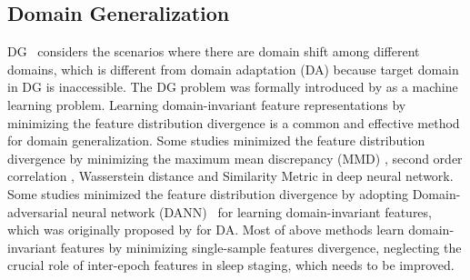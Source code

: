 \documentclass[letterpaper]{article} %
\begin{document}
	\subsection{Domain Generalization}
	DG~\citep{gulrajani2021in, zhou2021domain, wang2022generalizing} considers the scenarios where there are domain shift among different domains, which is different from domain adaptation (DA) \citep{wang2018deep, zhao2021plug} because target domain in DG is inaccessible.
	The DG problem was formally introduced by \citet{blanchard2011generalizing, muandet2013domain} as a machine learning problem.
	Learning domain-invariant feature representations by minimizing the feature distribution divergence is a common and effective method for domain generalization.
	Some studies minimized the feature distribution divergence by minimizing the maximum mean discrepancy (MMD) \citep{tzeng2014deep, wang2018visual, wang2020transfer}, second order correlation \citep{sun2016return, sun2016deep}, Wasserstein distance \citep{zhou2020domain} and Similarity Metric \citep{dou2019domain} in deep neural network.
	Some studies minimized the feature distribution divergence by adopting Domain-adversarial neural network (DANN)~\citep{li2018domain} for learning domain-invariant features, which was originally proposed by \citet{ganin2015unsupervised} for DA.
	Most of above methods learn domain-invariant features by minimizing single-sample features divergence, neglecting the crucial role of inter-epoch features in sleep staging, which needs to be improved.	
%		
\end{document}
